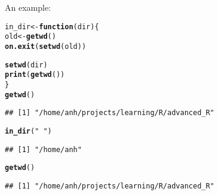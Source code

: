 \documentclass{article}\usepackage[]{graphicx}\usepackage[]{color}
\makeatletter
\newcommand{\hlstr}[1]{\textcolor[rgb]{0.192,0.494,0.8}{#1}}%
\newcommand{\hlstd}[1]{\textcolor[rgb]{0.345,0.345,0.345}{#1}}%
\newcommand{\hlkwa}[1]{\textcolor[rgb]{0.161,0.373,0.58}{\textbf{#1}}}%
\newcommand{\hlkwb}[1]{\textcolor[rgb]{0.69,0.353,0.396}{#1}}%
\newcommand{\hlkwc}[1]{\textcolor[rgb]{0.333,0.667,0.333}{#1}}%
\newcommand{\hlkwd}[1]{\textcolor[rgb]{0.737,0.353,0.396}{\textbf{#1}}}%
\newenvironment{kframe}{%
 \def\at@end@of@kframe{}%
 \ifinner\ifhmode%
  \def\at@end@of@kframe{\end{minipage}}%
  \begin{minipage}{\columnwidth}%
 \fi\fi%
 \def\FrameCommand##1{\hskip\@totalleftmargin \hskip-\fboxsep
 \colorbox{shadecolor}{##1}\hskip-\fboxsep
     \hskip-\linewidth \hskip-\@totalleftmargin \hskip\columnwidth}%
 \MakeFramed {\advance\hsize-\width
   \@totalleftmargin\z@ \linewidth\hsize
   \@setminipage}}%
 {\par\unskip\endMakeFramed%
 \at@end@of@kframe}
\newenvironment{knitrout}{}{} %
\makeatother
\begin{document}
An example:
\begin{knitrout}
\color{fgcolor}\begin{kframe}
\begin{alltt}
\hlstd{in_dir} \hlkwb{<-} \hlkwa{function}\hlstd{(}\hlkwc{dir}\hlstd{) \{}
  \hlstd{old} \hlkwb{<-} \hlkwd{getwd}\hlstd{()}
  \hlkwd{on.exit}\hlstd{(}\hlkwd{setwd}\hlstd{(old))}

  \hlkwd{setwd}\hlstd{(dir)}
  \hlkwd{print}\hlstd{(}\hlkwd{getwd}\hlstd{())}
\hlstd{\}}
\hlkwd{getwd}\hlstd{()}
\end{alltt}
\begin{verbatim}
## [1] "/home/anh/projects/learning/R/advanced_R"
\end{verbatim}
\begin{alltt}
\hlkwd{in_dir}\hlstd{(}\hlstr{"~"}\hlstd{)}
\end{alltt}
\begin{verbatim}
## [1] "/home/anh"
\end{verbatim}
\begin{alltt}
\hlkwd{getwd}\hlstd{()}
\end{alltt}
\begin{verbatim}
## [1] "/home/anh/projects/learning/R/advanced_R"
\end{verbatim}
\end{kframe}
\end{knitrout}
\end{document}
